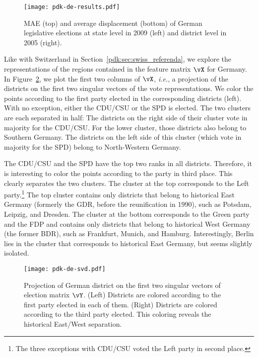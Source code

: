 \begin{figure}
	\texttt{[image: pdk-de-results.pdf]}
	\caption{MAE (top) and average displacement (bottom) of German legislative elections at state level in 2009 (left) and district level in 2005 (right).}
	\label{pdk:fig:de_results}
\end{figure}

Like with Switzerland in Section~\ref{pdk:sec:swiss_referenda}, we explore the representations of the regions contained in the feature matrix $\vX$ for Germany.
In Figure~\ref{pdk:fig:de_svd}, we plot the first two columns of $\vX$, \textit{i.e.}, a projection of the districts on the first two singular vectors of the vote representations.
We color the points according to the first party elected in the corresponding districts (left).
With no exception, either the CDU/CSU or the SPD is elected.
The two clusters are each separated in half:
The districts on the right side of their cluster vote in majority for the CDU/CSU.
For the lower cluster, those districts also belong to Southern Germany.
The districts on the left side of this cluster (which vote in majority for the SPD) belong to North-Western Germany.

The CDU/CSU and the SPD have the top two ranks in all districts.
Therefore, it is interesting to color the points according to the party in third place.
This clearly separates the two clusters.
The cluster at the top corresponds to the Left party.\footnote{The three exceptions with CDU/CSU voted the Left party in second place.}
The top cluster contains only districts that belong to historical East Germany (formerly the GDR, before the reunification in 1990), such as Potsdam, Leipzig, and Dresden.
The cluster at the bottom corresponds to the Green party and the FDP and contains only districts that belong to historical West Germany (the former BDR), such as Frankfurt, Munich, and Hamburg.
Interestingly, Berlin lies in the cluster that corresponds to historical East Germany, but seems slightly isolated.

\begin{figure}
	\texttt{[image: pdk-de-svd.pdf]}
	\caption{
		Projection of German district on the first two singular vectors of election matrix $\vY$.
		(Left) Districts are colored according to the first party elected in each of them.
		(Right) Districts are colored according to the third party elected.
		This coloring reveals the historical East/West separation.
	}
	\label{pdk:fig:de_svd}
\end{figure}
